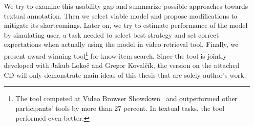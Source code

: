 We try to examine this usability gap and summarize possible approaches towards textual annotation. Then we select viable model and propose modifications to mitigate its shortcomings. Later on, we try to estimate performance of the model by simulating user, a task needed to select best strategy and set correct expectations when actually using the model in video retrieval tool. Finally, we present award winning tool\footnote{The tool competed at Video Browser Showdown~\cite{cobarzan2017interactive} and outperformed other participants' tools by more than 27 percent. In textual tasks, the tool performed even better.} for know-item search. Since the tool is jointly developed with Jakub Lokoč and Gregor Kovalčík, the version on the attached CD will only demonstrate main ideas of this thesis that are solely author's work.

